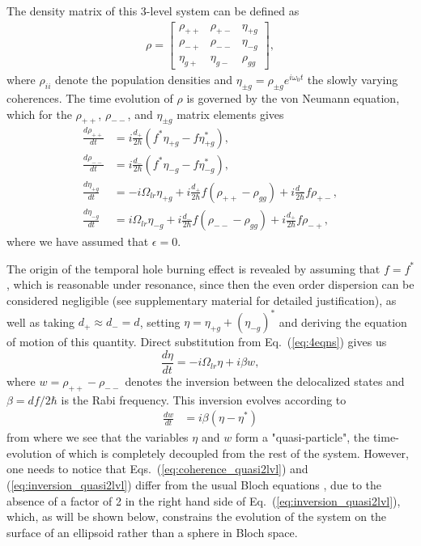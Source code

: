 \documentclass[reprint,secnumarabic,amssymb, nobibnotes, aip, prd]{revtex4-1}
\begin{document}
The density matrix of this 3-level system can be defined as 
\begin{align}
\rho = \begin{bmatrix}
\rho_{++} & \rho_{+-} & \eta_{+g} \\ 
\rho_{-+} & \rho_{--} & \eta_{-g} \\
\eta_{g+} & \eta_{g-} & \rho_{gg}
\end{bmatrix},
\end{align}
where $\rho_{ii}$ denote the population densities and $\eta_{\pm g} = \rho_{\pm g}e^{i\omega_0t}$ the slowly varying coherences. The time evolution of $\rho$ is governed by the von Neumann equation, which for the $\rho_{++}$, $\rho_{--}$, and $\eta_{\pm g}$ matrix elements gives  
\begin{subequations}
	\label{eq:4eqns}
	\begin{align}
	\frac{d \rho_{++}}{dt} &= i\frac{d_{+}}{2\hbar}(f^*\eta_{+g}-f\eta_{+g}^*), \\
	\frac{d \rho_{--}}{dt} &= i\frac{d_{-}}{2\hbar}(f^*\eta_{-g}-f\eta_{-g}^*), \\
	\frac{d \eta_{+g}}{dt} &= -i\Omega_{lr}\eta_{+g}+i\frac{d_{+}}{2\hbar}f(\rho_{++}-\rho_{gg})+i\frac{d_{-}}{2\hbar}f\rho_{+-}, \label{eq:eta+a}\\
	\frac{d \eta_{-g}}{dt} &= i\Omega_{lr}\eta_{-g}+i\frac{d_{-}}{2\hbar}f(\rho_{--}-\rho_{gg})+i\frac{d_{+}}{2\hbar}f\rho_{-+}, \label{eq:eta-a}
	\end{align}
\end{subequations}
where we have assumed that $\epsilon = 0$. 

The origin of the temporal hole burning effect is revealed by assuming that $f = f^*$, which is reasonable under resonance, since then the even order dispersion can be considered negligible\cite{khurgin2005optical} (see supplementary material for detailed justification), as well as taking $d_{+}\approx d_{-} = d$, setting  $\eta = \eta_{+g}+(\eta_{-g})^*$ and deriving the equation of motion of this quantity. Direct substitution from Eq.~(\ref{eq:4eqns}) gives us
\begin{equation}
\label{eq:coherence_quasi2lvl}
\frac{d \eta}{dt} = -i\Omega_{lr} \eta + i\beta w, 
\end{equation}
where $w = \rho_{++}-\rho_{--}$ denotes the inversion between the delocalized states and $\beta =d f/2\hbar$ is the Rabi frequency. This inversion evolves according to 
\begin{align}
\label{eq:inversion_quasi2lvl}
\frac{d w }{dt}	&=  i\beta(\eta-\eta^*)
\end{align}
from where we see that the variables $\eta$ and $w$ form a "quasi-particle", the time-evolution of which is completely decoupled from the rest of the system. However, one needs to notice that Eqs.~(\ref{eq:coherence_quasi2lvl}) and (\ref{eq:inversion_quasi2lvl}) differ from the usual Bloch equations \cite{boyd2003nonlinear}, due to the absence of a factor of 2 in the right hand side of Eq.~(\ref{eq:inversion_quasi2lvl}), which, as will be shown below, constrains the evolution of the system on the surface of an ellipsoid rather than a sphere in Bloch space.
\end{document}
